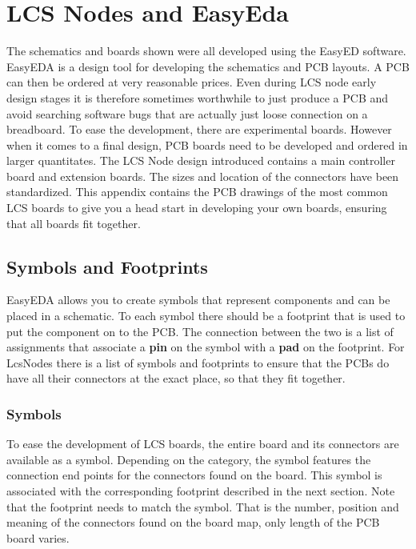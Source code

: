 \chapter{LCS Nodes and EasyEda}

The schematics and boards shown were all developed using the EasyED software. EasyEDA is a design tool for developing the schematics and PCB layouts. A PCB can then be ordered at very reasonable prices. Even during LCS node early design stages it is therefore sometimes worthwhile to just produce a PCB and avoid searching software bugs that are actually just loose connection on a breadboard. To ease the development, there are experimental boards. However when it comes to a final design, PCB boards need to be developed and ordered in larger quantitates. The LCS Node design introduced contains a main controller board and extension boards. The sizes and location of the connectors have been standardized. This appendix contains the PCB drawings of the most common LCS boards to give you a head start in developing your own boards, ensuring that all boards fit together.

\section{Symbols and Footprints}

EasyEDA allows you to create symbols that represent components and can be placed in a schematic. To each symbol there should be a footprint that is used to put the component on to the PCB. The connection between the two is a list of assignments that associate a \textbf{pin} on the symbol with a \textbf{pad} on the footprint. For LcsNodes there is a list of symbols and footprints to ensure that the PCBs do have all their connectors at the exact place, so that they fit together.

\subsection{Symbols}

To ease the development of LCS boards, the entire board and its connectors are available as a symbol. Depending on the category, the symbol features the connection end points for the connectors found on the board. This symbol is associated with the corresponding footprint described in the next section. Note that the footprint needs to match the symbol. That is the number, position and meaning of the connectors found on the board map, only length of the PCB board varies.

